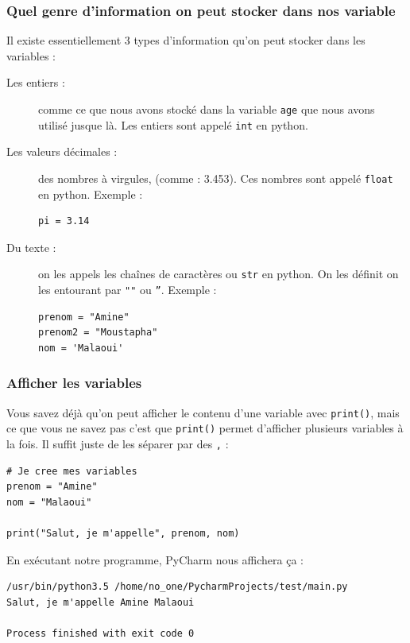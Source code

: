 \documentclass[12pt]{article}
\newcommand{\code}[1]{\colorbox{light-gray}{\texttt{#1}}}
\begin{document}
        \subsubsection{Quel genre d'information on peut stocker dans nos variable}
            Il existe essentiellement 3 types d'information qu'on peut stocker dans les variables :
            \begin{description}
                \item[Les entiers :] comme ce que nous avons stocké dans la variable \code{age} que nous avons 
                    utilisé jusque là. Les entiers sont appelé \code{int} en python.
                \item[Les valeurs décimales :] des nombres à virgules, (comme : 3.453). Ces nombres sont appelé 
                    \code{float} en python. Exemple :
                    \begin{lstlisting}[style=code]
pi = 3.14
                    \end{lstlisting}
                \item[Du texte :] on les appels les chaînes de caractères ou \code{str} en python. On les définit on les
                    entourant par \code{""} ou \code{''}. Exemple :
                    \begin{lstlisting}[style=code]
prenom = "Amine"
prenom2 = "Moustapha"
nom = 'Malaoui'
                    \end{lstlisting}
            \end{description}

        \subsubsection{Afficher les variables}
            Vous savez déjà qu'on peut afficher le contenu d'une variable avec \code{print()}, mais ce que vous 
            ne savez pas c'est que \code{print()} permet d'afficher plusieurs variables à la fois. Il suffit 
            juste de les séparer par des \code{,} :
            \begin{lstlisting}[style=code]
# Je cree mes variables
prenom = "Amine"
nom = "Malaoui"

print("Salut, je m'appelle", prenom, nom)
            \end{lstlisting}

            En exécutant notre programme, PyCharm nous affichera ça :

            \begin{lstlisting}[style=exec_result]
/usr/bin/python3.5 /home/no_one/PycharmProjects/test/main.py
Salut, je m'appelle Amine Malaoui

Process finished with exit code 0
            \end{lstlisting}
\end{document}

